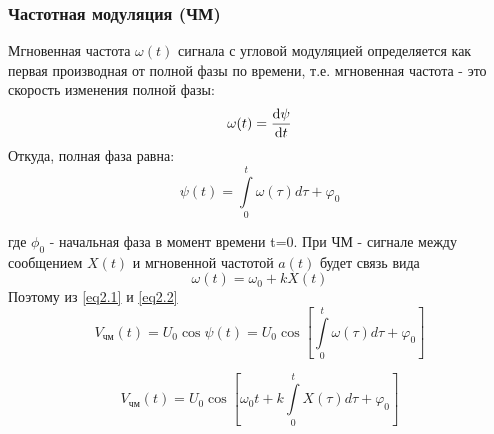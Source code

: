 \subsubsection{Частотная модуляция (ЧМ)}
Мгновенная частота $\omega(t)$ сигнала с угловой модуляцией определяется как первая производная от полной фазы по времени, т.е. мгновенная частота - это скорость изменения полной фазы:
\begin{gather}
	\omega (t)=\dv{\psi}{t}
\end{gather}
Откуда, полная фаза равна:
\begin{equation}
	\label{eq2.1}
	\psi(t)=\int\limits_{0}^{t} \omega(\tau) d \tau+\varphi_{0}
\end{equation}

где $\phi_0$ - начальная фаза в момент времени t=0.
При ЧМ - сигнале между сообщением $X(t)$ и мгновенной частотой $a(t)$ будет связь
вида
\begin{equation}
	\label{eq2.2}
	\omega(t)=\omega_{0}+k X(t)
\end{equation}
Поэтому из \eqref{eq2.1} и \eqref{eq2.2}
\begin{equation}
	V_\text{чм}(t)=U_{0} \cos \psi(t)=U_{0} \cos \left[\int\limits_{0}^{t} \omega(\tau) d \tau+\varphi_{0}\right]
\end{equation}


\begin{equation}
	V_\text{чм}(t)=U_{0} \cos \left[\omega_{0} t+k \int\limits_{0}^{t} X(\tau) d \tau+\varphi_{0}\right]
\end{equation}


